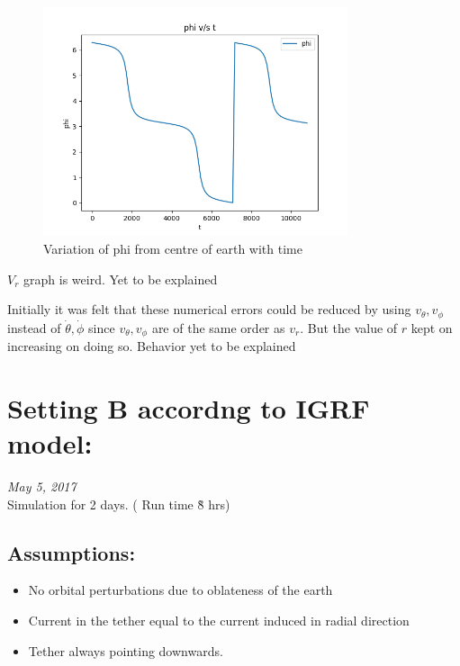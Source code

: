 \documentclass[11pt, a4paper]{article}
\begin{document}
\begin{figure}[H]
 \centering
 \includegraphics[width = 0.8\textwidth]{phi_arr0.png}
 \caption{Variation of phi from centre of earth with time}
\end{figure}


$V_r$ graph is weird. Yet to be explained

Initially it was felt that these numerical errors could be reduced by using $v_{\theta}, v_{\phi}$ instead of $\dot{\theta}, 
\dot{\phi}$ since $v_{\theta}, v_{\phi}$ are of the same order as $v_r$. But the value of $r$ kept on increasing on doing so.
Behavior yet to be explained


\section{Setting B accordng to IGRF model:}
\emph{May 5, 2017} \\

Simulation for 2 days. ( Run time \~8 hrs)

\subsection{Assumptions:}
\begin{itemize}
 \item No orbital perturbations due to oblateness of the earth
 \item Current in the tether equal to the current induced in radial direction
 \item Tether always pointing downwards.
\end{itemize}
\end{document}
